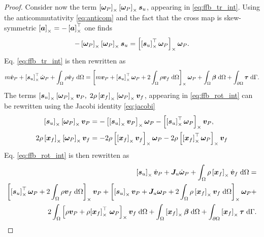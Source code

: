\begin{proof}
Consider now the term $\left[\bm{\omega}_P\right]_\times \left[\bm{\omega}_P\right]_\times \bm{s}_u$, appearing in \eqref{eq:ffb_tr_int}. Using the anticommutativity \eqref{eq:anticom} and the fact that the cross map is skew-symmetric $\left[\bm{a}\right]_\times = -\left[\bm{a}\right]_\times^\top$ one finds
\begin{align*}
-\left[\bm{\omega}_P\right]_\times \left[\bm{\omega}_P\right]_\times \bm{s}_u = \left[\left[\bm{s}_u\right]_\times^\top\bm{\omega}_{P}\right]_\times \bm{\omega}_{P}.
\end{align*}
Eq. \eqref{eq:ffb_tr_int} is then rewritten as
\begin{equation}
\label{eq:ffb_tr_fin}
m\dot{\bm{v}}_P + \crmat{\bm{s}_u}^\top \dot{\bm{\omega}}_P +   \int_{\Omega} \rho \dot{\bm{v}}_f \d{\Omega}  = 
\crmat{m \bm{v}_P + \crmat{\bm{s}_u}^\top \bm\omega_P +2 \int_{\Omega} \rho \bm{v}_f \d{\Omega}} \bm\omega_P +  \int_{\Omega} \bm\beta \d{\Omega} + \int_{\partial \Omega} \bm\tau \d{\Gamma}.
\end{equation}
The terms $\left[\bm{s}_u\right]_\times \left[\bm{\omega}_P\right]_\times \bm{v}_P, \; 2\rho \left[\bm{x}_f\right]_\times \left[\bm\omega_P\right]_\times {\bm{v}}_f$, appearing in \eqref{eq:ffb_rot_int} can be rewritten using the Jacobi identity \eqref{eq:jacobi}
\begin{align}
\left[\bm{s}_u\right]_\times \left[\bm{\omega}_P\right]_\times \bm{v}_P &= - \left[\left[\bm{s}_u\right]_\times \bm{v}_P\right]_\times \bm{\omega}_P - \left[\left[\bm{s}_u\right]_\times^\top \bm{\omega}_P\right]_\times \bm{v}_P, \\
2\rho \left[\bm{x}_f\right]_\times \left[\bm\omega_P\right]_\times {\bm{v}}_f &= - 2\rho \left[\left[\bm{x}_f\right]_\times \bm{v}_f\right]_\times\bm\omega_P - 2\rho \left[\left[\bm{x}_f\right]_\times^\top \bm\omega_P\right]_\times \bm{v}_f
\end{align}
Eq. \eqref{eq:ffb_rot_int} is then rewritten as
\begin{equation}
\label{eq:ffb_rot_fin}
\begin{split}
\crmat{\bm{s}_u} \dot{\bm{v}}_P  + \bm{J}_u \dot{\bm\omega}_P + \int_{\Omega} \rho \crmat{\bm{x}_f} \dot{\bm{v}}_f \d{\Omega} = \\
\crmat{\crmat{\bm{s}_u}^\top \bm\omega_P + 2 \int_{\Omega} \rho \bm{v}_f \d{\Omega}} \bm{v}_P + \crmat{\crmat{\bm{s}_u} \bm{v}_P + \bm{J}_u \bm\omega_P + 2 \int_{\Omega} \rho \crmat{\bm{x}_f} {\bm{v}}_f \d{\Omega}} \bm\omega_P + 
\\
2 \int_{\Omega} \crmat{\rho {\bm{v}_P} + \rho {\crmat{\bm{x}_f}^\top \, \bm\omega_P}} \bm{v}_f \d{\Omega} + \int_{\Omega}\crmat{\bm{x}_f} \bm\beta \d{\Omega} + \int_{\partial \Omega}\crmat{\bm{x}_f} \bm{\tau} \d{\Gamma}.
\end{split}
\end{equation}

\end{proof}
